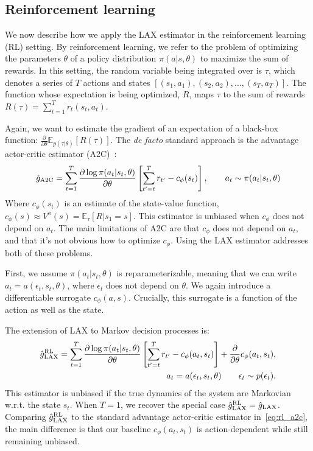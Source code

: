 \documentclass{article}
\newcommand{\E}{\mathbb{E}}
\newcommand{\LL}[1]{\frac{\partial \log \pi(a_{#1}| s_{#1}, \theta)}{\partial \theta}}
\newcommand{\PT}{\frac{\partial}{\partial \theta}}
\newcommand{\LAX}{{\textnormal{LAX}}}
\newcommand{\RL}{{\textnormal{RL}}}
\begin{document}
\subsection{Reinforcement learning}
We now describe how we apply the \LAX{} estimator in the reinforcement learning (RL) setting.
By reinforcement learning, we refer to the problem of optimizing the parameters $\theta$ of a policy distribution $\pi(a | s, \theta)$ to maximize the sum of rewards.
In this setting, the random variable being integrated over is $\tau$, which denotes a series of $T$ actions and states $[(s_1, a_1), (s_2, a_2), ..., (s_T, a_T)]$.
The function whose expectation is being optimized, $R$, maps $\tau$ to the sum of rewards ${R(\tau) = \sum_{t=1}^{T} r_t(s_t, a_t)}$.

Again, we want to estimate the gradient of an expectation of a black-box function: $ \PT \E_{p(\tau|\theta)}[R(\tau)]$.
The \emph{de facto} standard approach is the advantage actor-critic estimator (A2C)~\citep{sutton2000policy}:
%
%
%
\begin{align}
\hat g_{\textnormal{A2C}} = \sum_{t=1}^{T} \LL{t} \left[ \sum_{t'=t}^{T} r_{t'} - c_\phi(s_t) \right], \qquad a_t \sim \pi(a_t | s_t, \theta)
\label{eq:rl_a2c}
\end{align}
%
Where $c_\phi(s_t)$ is an estimate of the state-value function, $c_\phi(s) \approx V^\pi(s) = \E_{\tau}[R|s_1=s].$
This estimator is unbiased when $c_\phi$ does not depend on $a_t$.
The main limitations of A2C are that $c_\phi$ does not depend on $a_t$, and that it's not obvious how to optimize $c_\phi$.
Using the \LAX{} estimator addresses both of these problems.

First, we assume $\pi(a_t|s_t, \theta)$ is reparameterizable, meaning that we can write $a_t = a(\epsilon_t, s_t, \theta)$, where $\epsilon_t$ does not depend on $\theta$.
We again introduce a differentiable surrogate $c_\phi(a,s)$.
Crucially, this surrogate is a function of the action as well as the state.

The extension of LAX to Markov decision processes is: 
%
\begin{align}
\hat g_\LAX^{\RL} = \sum_{t=1}^{T} \LL{t} \left[ \sum_{t'=t}^{T} r_{t'} - c_\phi(a_t,s_t) \right] +\frac{\partial}{\partial\theta} c_\phi(a_t, s_t), \\
a_t = a(\epsilon_t,s_t, \theta) \qquad \epsilon_t \sim p(\epsilon_t)\nonumber.
\label{eq:rl_est}
\end{align}
%
This estimator is unbiased if the true dynamics of the system are Markovian w.r.t. the state $s_t$.
When $T = 1$, we recover the special case ${\hat g_\LAX^{\RL} = \hat g_\LAX}$.
Comparing $\hat g_\LAX^{\RL}$ to the standard advantage actor-critic estimator in~\eqref{eq:rl_a2c}, the main difference is that our baseline $c_\phi(a_t, s_t)$ is action-dependent while still remaining unbiased.
\end{document}
